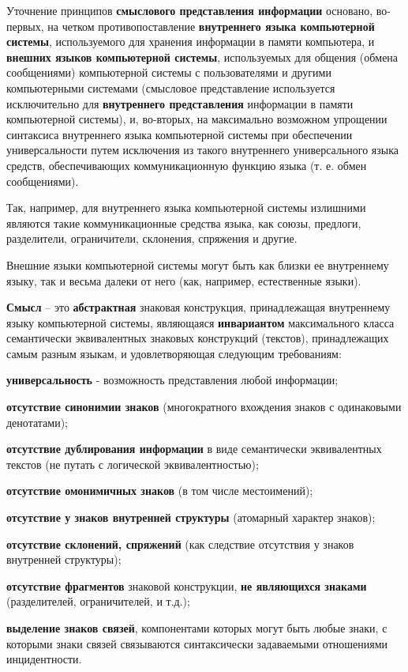 \begin{SCn}
{Уточнение принципов \textbf{смыслового представления информации} основано, во-первых, на четком противопоставление \textbf{внутреннего языка компьютерной системы}, используемого для хранения информации в памяти компьютера, и \textbf{внешних языков компьютерной системы}, используемых для общения (обмена сообщениями) компьютерной системы с пользователями и другими компьютерными системами (смысловое представление используется исключительно для \textbf{внутреннего представления} информации в памяти компьютерной системы), и, во-вторых, на максимально возможном упрощении синтаксиса внутреннего языка компьютерной системы при обеспечении универсальности  путем исключения из такого внутреннего универсального языка средств, обеспечивающих коммуникационную функцию языка (т. е. обмен сообщениями).

Так, например, для внутреннего языка компьютерной системы излишними являются такие коммуникационные средства языка, как союзы, предлоги, разделители, ограничители, склонения, спряжения и другие.

Внешние языки компьютерной системы могут быть как близки ее внутреннему языку, так и весьма далеки от него (как, например, естественные языки).

\textbf{Смысл} – это \textbf{абстрактная} знаковая конструкция, принадлежащая внутреннему языку компьютерной системы, являющаяся \textbf{инвариантом} максимального класса семантически эквивалентных знаковых конструкций (текстов), принадлежащих самым разным языкам, и удовлетворяющая следующим требованиям:
\begin{scnitemize}
    \item \textbf{универсальность} - возможность представления любой информации;
    \item \textbf{отсутствие синонимии знаков} (многократного вхождения знаков с одинаковыми денотатами);
    \item \textbf{отсутствие дублирования информации} в виде семантически эквивалентных текстов (не путать с логической эквивалентностью);
    \item \textbf{отсутствие омонимичных знаков} (в том числе местоимений);
    \item \textbf{отсутствие у знаков внутренней структуры} (атомарный характер знаков);
    \item \textbf{отсутствие склонений, спряжений} (как следствие отсутствия у знаков внутренней структуры);
    \item \textbf{отсутствие фрагментов} знаковой конструкции, \textbf{не являющихся знаками} (разделителей, ограничителей, и т.д.);
    \item \textbf{выделение знаков связей}, компонентами которых могут быть любые знаки, с которыми знаки связей связываются синтаксически задаваемыми отношениями инцидентности.
\end{scnitemize}

}
\end{SCn}
